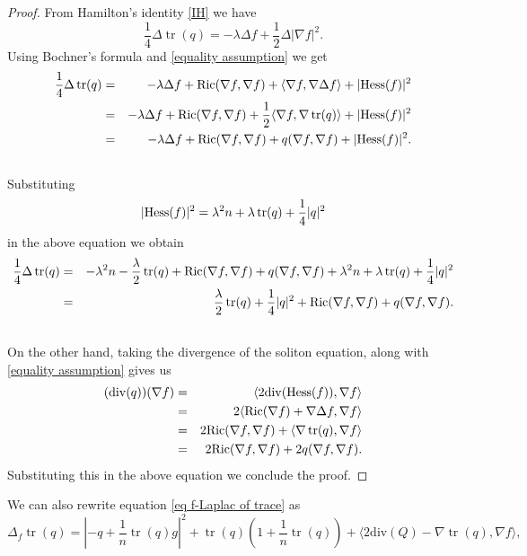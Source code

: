 \documentclass{amsart}
\theoremstyle{plain}
\numberwithin{equation}{section}
\begin{document}
\begin{proof}
From Hamilton's identity \eqref{IH} we have 
    $$\frac{1}{4}\Delta \operatorname{tr}(q)=-\lambda\Delta f+\frac{1}{2}\Delta|\nabla f|^2.$$
 Using Bochner's formula and \eqref{equality assumption} we get
 \begin{eqnarray}\label{eq}
\nonumber\frac{1}{4}\Delta \operatorname{tr}(q) &=& -\lambda\Delta f+{\rm Ric}(\nabla f,\nabla f)+\langle\nabla f,\nabla\Delta f\rangle+|{\rm Hess}(f)|^2\\\nonumber
&=& -\lambda\Delta f+{\rm Ric}(\nabla f,\nabla f)+\frac{1}{2}\langle\nabla f,\nabla \operatorname{tr}(q)\rangle+|{\rm Hess}(f)|^2\\
&=& -\lambda\Delta f+{\rm Ric}(\nabla f,\nabla f)+q(\nabla f,\nabla f)+|{\rm Hess}(f)|^2.\\\nonumber
 \end{eqnarray}
Substituting  
$$|{\rm Hess}(f)|^2=\lambda^2n+\lambda \operatorname{tr}(q)+\frac{1}{4}|q|^2$$ in the above equation we obtain 
 \begin{eqnarray}\label{eq03}
\nonumber\frac{1}{4}\Delta \operatorname{tr}(q) &=& -\lambda ^2n-\frac{\lambda}{2}\operatorname{tr}(q)+{\rm Ric}(\nabla f,\nabla f)+q(\nabla f,\nabla f)+\lambda^2n+\lambda \operatorname{tr}(q)+\frac{1}{4}|q|^2\\\nonumber
&=& \frac{\lambda}{2}\operatorname{tr}(q)+\frac{1}{4}|q|^2+{\rm Ric}(\nabla f,\nabla f)+q(\nabla f,\nabla f).\\\nonumber
\end{eqnarray} 
On the other hand, taking the divergence of the soliton equation, along with  \eqref{equality assumption} gives us
\begin{eqnarray}\label{Ric and div}
  \nonumber(\mathrm{div}(q))(\nabla f)  &=& \langle 2\mathrm{div}({\rm Hess}(f)),\nabla f\rangle\\\nonumber
  &=& 2\langle {\rm Ric}(\nabla f)+\nabla\Delta f,\nabla f\rangle \\
  &=& 2{\rm Ric}(\nabla f,\nabla f)+\langle \nabla \operatorname{tr}(q),\nabla f\rangle\\
  &=& 2{\rm Ric}(\nabla f,\nabla f)+2q(\nabla f,\nabla f).\nonumber
\end{eqnarray}
Substituting this in the above equation we conclude the proof.
\end{proof}

We can also rewrite equation \eqref{eq f-Laplac of trace} as
\begin{equation}
    \Delta_f\operatorname{tr}(q)=\left|-q+\frac{1}{n}\operatorname{tr}(q)g\right|^2+\operatorname{tr}(q)\left(1+\frac{1}{n}\operatorname{tr}(q)\right)+\langle 2\mathrm{div}(Q)-\nabla \operatorname{tr}(q),\nabla f\rangle,
\end{equation}
\end{document}

